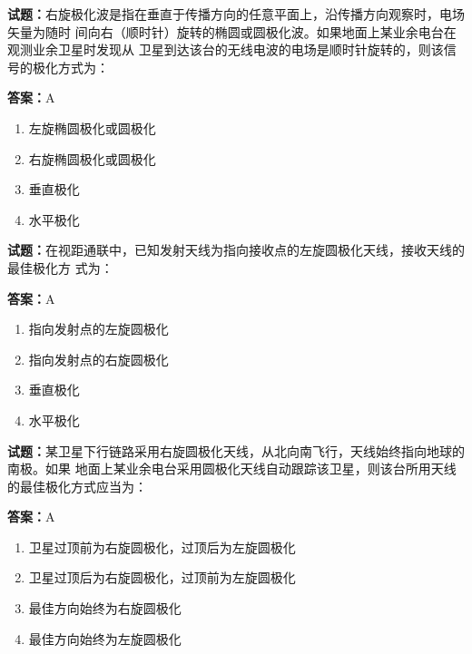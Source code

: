 \documentclass{ctexbook}
\begin{document}
\textbf{试题：}右旋极化波是指在垂直于传播方向的任意平面上，沿传播方向观察时，电场矢量为随时
间向右（顺时针）旋转的椭圆或圆极化波。如果地面上某业余电台在观测业余卫星时发现从
卫星到达该台的无线电波的电场是顺时针旋转的，则该信号的极化方式为： 

\textbf{答案：}A 

\begin{enumerate}[leftmargin=3em]
  \item 左旋椭圆极化或圆极化 

  \item 右旋椭圆极化或圆极化 

  \item 垂直极化 

  \item 水平极化 

\end{enumerate}





\vspace{1em}

\textbf{试题：}在视距通联中，已知发射天线为指向接收点的左旋圆极化天线，接收天线的最佳极化方
式为： 

\textbf{答案：}A 

\begin{enumerate}[leftmargin=3em]
  \item 指向发射点的左旋圆极化 

  \item 指向发射点的右旋圆极化 

  \item 垂直极化 

  \item 水平极化 

\end{enumerate}





\vspace{1em}

\textbf{试题：}某卫星下行链路采用右旋圆极化天线，从北向南飞行，天线始终指向地球的南极。如果
地面上某业余电台采用圆极化天线自动跟踪该卫星，则该台所用天线的最佳极化方式应当为： 

\textbf{答案：}A 

\begin{enumerate}[leftmargin=3em]
  \item 卫星过顶前为右旋圆极化，过顶后为左旋圆极化 

  \item 卫星过顶后为右旋圆极化，过顶前为左旋圆极化 

  \item 最佳方向始终为右旋圆极化 

  \item 最佳方向始终为左旋圆极化 

\end{enumerate}
\end{document}
